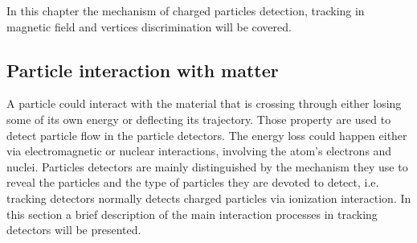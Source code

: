In this chapter the mechanism of charged particles detection, tracking in magnetic field and vertices discrimination will be covered.
\subsection{Particle interaction with matter}
A particle could interact with the material that is crossing through either losing some of its own energy or deflecting its trajectory. Those property are used to detect particle flow in the particle detectors.
The energy loss could happen either via electromagnetic or nuclear interactions, involving the atom's electrons and nuclei.
Particles detectors are mainly distinguished by the mechanism they use to reveal the particles and the type of particles they are devoted to detect, i.e. tracking detectors normally detects charged particles via ionization interaction.
In this section a brief description of the main interaction processes in tracking detectors will be presented.


